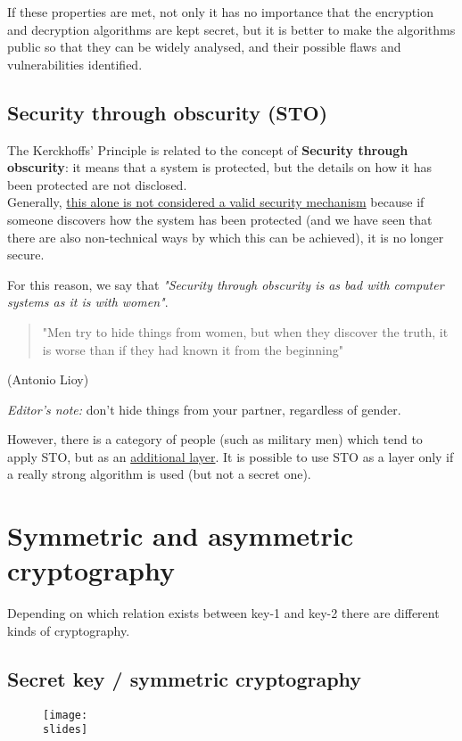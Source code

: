 If these properties are met, 
not only it has no importance that the encryption and decryption algorithms are kept secret, but it is better to
make the algorithms public so that they can be widely analysed, and their possible flaws and vulnerabilities identified.

\subsection*{Security through obscurity (STO)}
The Kerckhoffs' Principle is related to the concept of \textbf{Security through obscurity}: it means that a system is protected, but the details on how it has been protected are not disclosed.\\
Generally, \ul{this alone is not considered a valid security mechanism} because if someone discovers how the system has been protected (and we have seen that there are also non-technical ways by which this can be achieved), it is no longer secure. 

For this reason, we say that \emph{"Security through obscurity is as bad with computer systems as it is with women"}.
\begin{quote}
    "Men try to hide things from women, but when they discover the truth, it is worse than if they had known it from the beginning"
\end{quote}
\begin{flushright}
    (Antonio Lioy)
  \end{flushright}
\emph{Editor's note:} don't hide things from your partner, regardless of gender.


However, there is a category of people (such as military men) which tend to apply STO, but as an \ul{additional
layer}. It is possible to use STO as a layer only if a really strong algorithm is used (but not a secret one).



\section{Symmetric and asymmetric cryptography}
Depending on which relation exists between key-1 and key-2 there are different kinds of cryptography.

\subsection*{Secret key / symmetric cryptography}
\begin{figure}[h]
    \centering
    \texttt{[image: \\slides]}
\end{figure}

